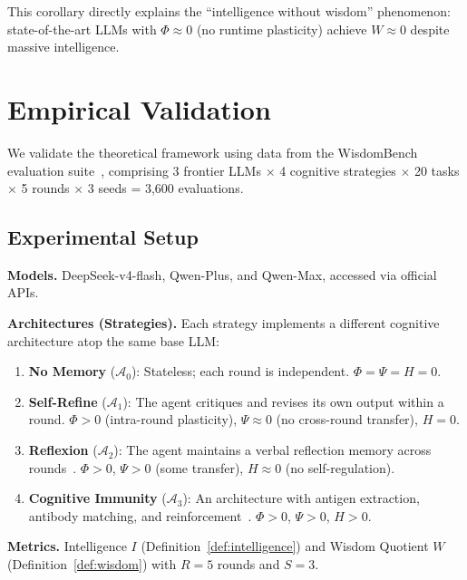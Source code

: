 \documentclass{article}
\newcommand{\cA}{\mathcal{A}}
\begin{document}
This corollary directly explains the ``intelligence without wisdom'' phenomenon: state-of-the-art LLMs with $\Phi \approx 0$ (no runtime plasticity) achieve $W \approx 0$ despite massive intelligence.

\section{Empirical Validation}
\label{sec:experiments}

We validate the theoretical framework using data from the WisdomBench evaluation suite~\citep{anon2026p2}, comprising 3 frontier LLMs $\times$ 4 cognitive strategies $\times$ 20 tasks $\times$ 5 rounds $\times$ 3 seeds = 3{,}600 evaluations.

\subsection{Experimental Setup}

\textbf{Models.} DeepSeek-v4-flash, Qwen-Plus, and Qwen-Max, accessed via official APIs.

\textbf{Architectures (Strategies).}
Each strategy implements a different cognitive architecture atop the same base LLM:
\begin{enumerate}[leftmargin=*,itemsep=1pt]
    \item \textbf{No Memory} ($\cA_0$): Stateless; each round is independent. $\Phi = \Psi = H = 0$.
    \item \textbf{Self-Refine} ($\cA_1$): The agent critiques and revises its own output within a round. $\Phi > 0$ (intra-round plasticity), $\Psi \approx 0$ (no cross-round transfer), $H = 0$.
    \item \textbf{Reflexion} ($\cA_2$): The agent maintains a verbal reflection memory across rounds~\citep{shinn2023reflexion}. $\Phi > 0$, $\Psi > 0$ (some transfer), $H \approx 0$ (no self-regulation).
    \item \textbf{Cognitive Immunity} ($\cA_3$): An architecture with antigen extraction, antibody matching, and reinforcement~\citep{anon2026p1}. $\Phi > 0$, $\Psi > 0$, $H > 0$.
\end{enumerate}

\textbf{Metrics.}
Intelligence $I$ (Definition~\ref{def:intelligence}) and Wisdom Quotient $W$ (Definition~\ref{def:wisdom}) with $R = 5$ rounds and $S = 3$.
\end{document}

